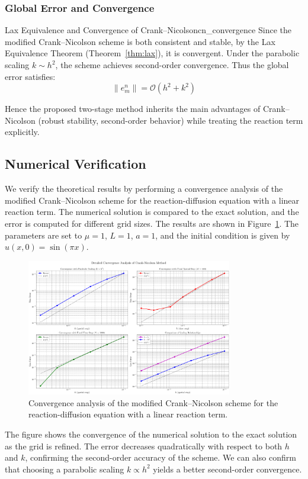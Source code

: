 \subsubsection{Global Error and Convergence}

\begin{theorem}{Lax Equivalence and Convergence of Crank--Nicolson}{cn_convergence}
  Since the modified Crank--Nicolson scheme is both consistent and stable, by the Lax Equivalence Theorem
  (Theorem~\ref{thm:lax}), it is convergent. Under the parabolic scaling $k \sim h^2$, the scheme achieves
  second-order convergence. Thus the global error satisfies:
  \[
    \|e_m^n\| = \mathcal{O}\!\left(h^2 + k^2\right)
  \]

\end{theorem}

Hence the proposed two-stage method inherits the main advantages of Crank--Nicolson (robust stability, second-order behavior) while treating the reaction term explicitly.

\subsection{Numerical Verification}
We verify the theoretical results by performing a convergence analysis of the modified Crank--Nicolson scheme for the reaction-diffusion equation with a linear reaction term. The numerical solution is compared to the exact solution, and the error is computed for different grid sizes. The results are shown in Figure~\ref{fig:convergence_analysis_2d}.
The parameters are set to \(\mu = 1\), \(L = 1\), \(a = 1\), and the initial condition is given by \(u(x,0) = \sin(\pi x)\).
\begin{figure}[H]
  \centering
  \includegraphics[width=0.8\textwidth]{figures/convergence_analysis_2d.png}
  \caption{Convergence analysis of the modified Crank--Nicolson scheme for the reaction-diffusion equation with a linear reaction term.}
  \label{fig:convergence_analysis_2d}
\end{figure}
The figure shows the convergence of the numerical solution to the exact solution as the grid is refined.
The error decreases quadratically with respect to both \(h\) and \(k\), confirming the second-order accuracy of the scheme.
We can also confirm that choosing a parabolic scaling \(k \propto h^2\) yields a better second-order convergence.







